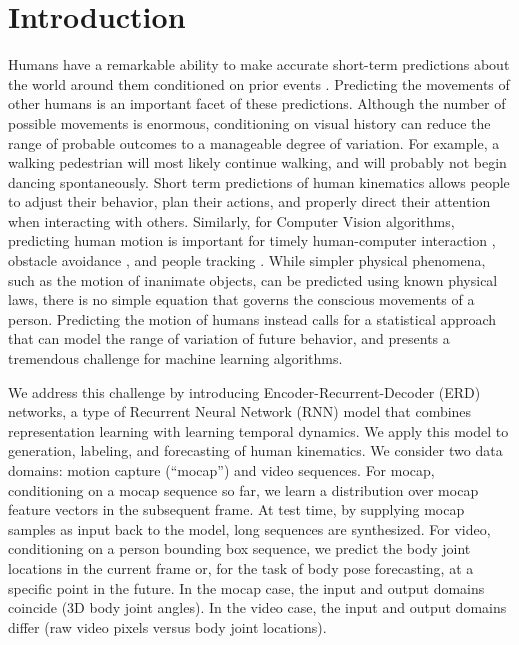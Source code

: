 \documentclass[10pt,twocolumn,letterpaper]{article}
\begin{document}
\section{Introduction}


Humans have a remarkable ability to make accurate short-term predictions about the world around them conditioned on prior events \cite{DBLP:series/csm/VernonHF11}. Predicting the movements of other humans is an important facet of these predictions. 
Although the number of possible movements is enormous, conditioning on visual history can reduce the range of probable outcomes to a manageable degree of variation. For example, a walking pedestrian will most likely continue walking, and will probably not begin dancing spontaneously.
Short term predictions of human 
kinematics  
allows people to adjust their behavior, plan their actions, and properly direct their attention when interacting with others.  Similarly, for Computer Vision algorithms, predicting human motion is important for timely human-computer interaction \cite{DBLP:conf/iros/KoppulaS13}, obstacle avoidance \cite{DBLP:conf/iccv/PellegriniESG09}, and people tracking \cite{planningtracking}. While simpler physical phenomena, such as the motion of inanimate objects, can be predicted using known physical laws, there is no simple equation that governs the conscious movements of a person. Predicting the motion of humans instead calls for a statistical approach that can model the range of variation of future behavior, and presents a tremendous challenge for machine learning algorithms.


We address this challenge by introducing Encoder-Recurrent-Decoder (ERD) networks, a type of Recurrent Neural  Network (RNN) model \cite{Williams:1989:LAC:1351124.1351135, Elman} that combines representation learning with learning temporal dynamics. We apply this model to generation, labeling, and forecasting of human kinematics. 
We consider two data domains: motion capture (``mocap'') and video sequences.
For mocap, conditioning on a mocap sequence so far, we learn a distribution over mocap feature vectors in the subsequent frame. At test time, by supplying mocap samples as input back to the model, long  sequences are synthesized. 
For video, conditioning on  a person  bounding box sequence, we predict the body joint locations in the current frame or, for the task of body pose forecasting, at a specific point in the future.
In the mocap case, the input and output domains coincide (3D body joint angles).  
In the  video case, the input and output domains differ (raw video pixels versus body joint locations). 
\end{document}
